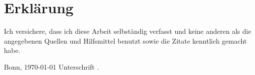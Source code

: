 
\chapter*{Erklärung}

Ich versichere, dass ich diese Arbeit selbständig verfasst und keine anderen als die
angegebenen Quellen und Hilfsmittel benutzt sowie die Zitate kenntlich gemacht habe.

\vspace{10ex}

Bonn, \today \hspace{3em} Unterschrift \hrulefill.
